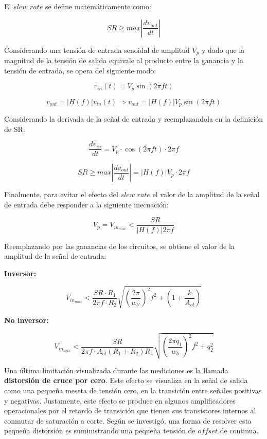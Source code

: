 El $slew$ $rate$ se define matemáticamente como:

$$SR\geq max\left | \frac{dv_{out}}{dt} \right |$$

Considerando una tensión de entrada senoidal de amplitud $V_{p}$ y dado que la magnitud de la tensión de salida equivale al producto entre la ganancia y la tensión de entrada, se opera del siguiente modo:

$$v_{in}(t)=V_{p}\sin (2\pi ft)$$

$$v_{out}=\left | H(f) \right |v_{in}(t)\Rightarrow v_{out}=\left | H(f) \right |V_{p}\sin (2\pi ft)$$

Considerando la derivada de la señal de entrada y reemplazandola en la definición de SR:

$$\frac{dv_{in}}{dt} = V_{p}\cdot \cos (2\pi ft)\cdot 2\pi f $$

$$SR\geq max\left | \frac{dv_{out}}{dt} \right | = \left | H(f) \right |V_{p}\cdot 2\pi f$$

Finalmente, para evitar el efecto del $slew$ $rate$ el valor de la amplitud de la señal de entrada debe responder a la siguiente inecuación:

$$V_{p}=V_{in_{max}}<\frac{SR}{\left | H(f) \right |2\pi f}$$

Reemplazando por las ganancias de los circuitos, se obtiene el valor de la amplitud de la señal de entrada:

\textbf{Inversor:}

\begin{equation} \label{eq:sr1}
V_{in_{max}}<\frac{SR\cdot R_{1}}{2\pi f\cdot R_{2}}\sqrt{(\frac{2\pi}{w_{b'}})^{2}f^{2}+(1+\frac{k}{A_{ol}})}
\end{equation}


\textbf{No inversor:}

\begin{equation} \label{eq:sr2}
V_{in_{max}}<\frac{SR}{2\pi f\cdot A_{ol}(R_{1}+R_{2})R_{4}}\sqrt{(\frac{2\pi q_{1}}{w_{b}})^{2}f^{2}+q_{2}^{2}}
\end{equation}



Una última limitación visualizada durante las mediciones es la llamada \textbf{distorsión de cruce por cero}. Este efecto se visualiza en la señal de salida como una pequeña meseta de tensión cero, en la transición entre señales positivas y negativas. Justamente, este efecto se produce en algunos amplificadores operacionales por el retardo de transición que tienen sus transistores internos al conmutar de saturación a corte. Según se investigó, una forma de resolver esta pequeña distorsión es suministrando una pequeña tensión de $offset$ de continua. 

